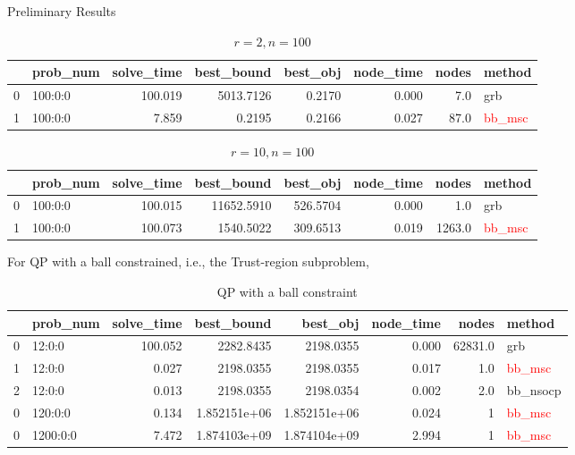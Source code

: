 \documentclass[aspectratio=1610, 10pt]{beamer}
\newcommand{\red}[1]{\textcolor{red}{#1}}
\begin{document}
\begin{frame}[allowframebreaks]{Preliminary Results}
\begin{table}[h!]
  \end{table}
  \begin{table}[h!]
    \begin{tabular}{llrrrrrl}
      \toprule
      {} & prob\_num & solve\_time & best\_bound & best\_obj & node\_time & nodes & method        \\
      \midrule
      0  & 100:0:0   & 100.019     & 5013.7126   & 0.2170    & 0.000      & 7.0   & grb           \\
      1  & 100:0:0   & 7.859       & 0.2195      & 0.2166    & 0.027      & 87.0  & \red{bb\_msc} \\
      \bottomrule
    \end{tabular}
    \caption{\(r=2, n=100\)}
  \end{table}
  \begin{table}[h!]
    \begin{tabular}{llrrrrrl}
      \toprule
      {} & prob\_num & solve\_time & best\_bound & best\_obj & node\_time & nodes  & method        \\
      \midrule
      0  & 100:0:0   & 100.015     & 11652.5910  & 526.5704  & 0.000      & 1.0    & grb           \\
      1  & 100:0:0   & 100.073     & 1540.5022   & 309.6513  & 0.019      & 1263.0 & \red{bb\_msc} \\
      \bottomrule
    \end{tabular}
    \caption{\(r=10, n=100\)}
  \end{table}
  \normalsize
  \framebreak
  For QP with a ball constrained, i.e., the Trust-region subproblem,
  \scriptsize
  \begin{table}[h!]
    \begin{tabular}{llrrrrrl}
      \toprule
      {} & prob\_num & solve\_time & best\_bound  & best\_obj    & node\_time & nodes   & method        \\
      \midrule
      0  & 12:0:0    & 100.052     & 2282.8435    & 2198.0355    & 0.000      & 62831.0 & grb           \\
      1  & 12:0:0    & 0.027       & 2198.0355    & 2198.0355    & 0.017      & 1.0     & \red{bb\_msc} \\
      2  & 12:0:0    & 0.013       & 2198.0355    & 2198.0354    & 0.002      & 2.0     & bb\_nsocp     \\
      \midrule
      0  & 120:0:0   & 0.134       & 1.852151e+06 & 1.852151e+06 & 0.024      & 1       & \red{bb\_msc} \\
      \midrule
      0  & 1200:0:0  & 7.472       & 1.874103e+09 & 1.874104e+09 & 2.994      & 1       & \red{bb\_msc} \\
      \bottomrule
    \end{tabular}
    \caption{QP with a ball constraint}
  \end{table}
  \normalsize


\end{frame}
\end{document}
